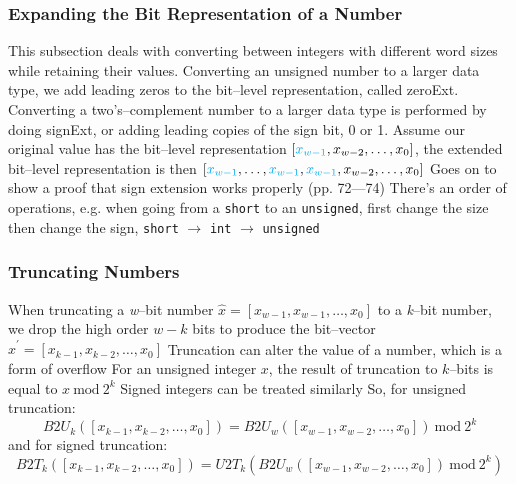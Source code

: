 \documentclass[../bryant_comp_sys.tex]{subfiles}
\begin{document}
            \subsubsection{Expanding the Bit Representation of a Number}
                \begin{outline}
                    \1 This subsection deals with converting between integers with different word sizes while retaining their values.
                    \1 Converting an unsigned number to a larger data type, we add leading zeros to the bit--level representation, called \gls{zeroExt}.
                    \1 Converting a two's--complement number to a larger data type is performed by doing \gls{signExt}, or adding leading copies of the sign bit, 0 or 1.
                        \2 Assume our original value has the bit--level representation \( \left[ {\color{cyan} x_{w-1}}, x_{w-2}, \ldots, x_0 \right] \), the extended bit--level representation is then \( \left[ {\color{cyan} x_{w-1}}, \ldots, {\color{cyan} x_{w-1}}, {\color{cyan} x_{w-1}}, x_{w-2}, \ldots, x_0 \right] \)
                    \1 Goes on to show a proof that sign extension works properly (pp. 72---74)
                    \1 There's an order of operations, e.g. when going from a \texttt{short} to an \texttt{unsigned}, first change the size then change the sign, \texttt{short} \( \rightarrow \) \texttt{int} \( \rightarrow \) \texttt{unsigned}
                \end{outline}

            \subsubsection{Truncating Numbers}
                \begin{outline}
                    \1 When truncating a \textit{w}--bit number \( \hat{x} = \left[ x_{w-1}, x_{w-1}, \ldots, x_0 \right] \) to a \textit{k}--bit number, we drop the high order \( w - k \) bits to produce the bit--vector \( \hat{x}^{\prime} = \left[ x_{k-1}, x_{k-2}, \ldots, x_0 \right] \)
                    \1 Truncation can alter the value of a number, which is a form of overflow
                    \1 For an unsigned integer \( x \), the result of truncation to \( k \)--bits is equal to \( x~\text{mod}~2^k \)
                        \2 Signed integers can be treated similarly
                        \2 So, for unsigned truncation:
                        \[
                            B2U_k \left( \left[ x_{k-1}, x_{k-2}, \ldots, x_0 \right] \right) = B2U_w \left( \left[ x_{w-1}, x_{w-2}, \ldots, x_0 \right] \right)~\text{mod}~2^k
                        \]
                        and for signed truncation:
                        \[
                            B2T_k \left( \left[ x_{k-1}, x_{k-2}, \ldots, x_0 \right] \right) = U2T_k \left( B2U_w \left( \left[ x_{w-1}, x_{w-2}, \ldots, x_0 \right] \right)~\text{mod}~2^k \right)
                        \]
                \end{outline}
\end{document}
